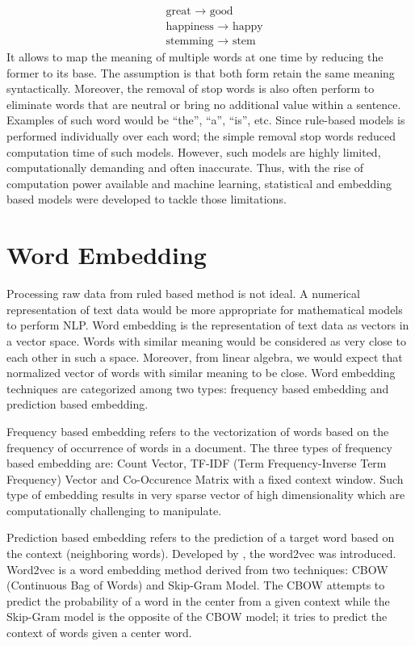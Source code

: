 \begin{align*}
    &\text{great → good} \\
    &\text{happiness → happy} \\
    &\text{stemming → stem}
\end{align*}
It allows to map the meaning of multiple words at one time by reducing the former to its base. The assumption is that both form retain the same meaning syntactically. Moreover, the removal of stop words is also often perform to eliminate words that are neutral or bring no additional value within a sentence. Examples of such word would be “the”, “a”, “is”, etc. Since rule-based models is performed individually over each word; the simple removal stop words reduced computation time of such models. However, such models are highly limited, computationally demanding and often inaccurate. Thus, with the rise of computation power available and machine learning, statistical and embedding based models were developed to tackle those limitations.
\section{Word Embedding}
Processing raw data from ruled based method is not ideal. A numerical representation of text data would be more appropriate for mathematical models to perform NLP. Word embedding is the representation of text data as vectors in a vector space. Words with similar meaning would be considered as very close to each other in such a space. Moreover, from linear algebra, we would expect that normalized vector of words with similar meaning to be close. Word embedding techniques are categorized among two types: frequency based embedding and prediction based embedding. 

Frequency based embedding refers to the vectorization of words based on the frequency of occurrence of words in a document. The three types of frequency based embedding are: Count Vector, TF-IDF (Term Frequency-Inverse Term Frequency) Vector and Co-Occurence Matrix with a fixed context window. Such type of embedding results in very sparse vector of high dimensionality which are computationally challenging to manipulate. 

Prediction based embedding refers to the prediction of a target word based on the context (neighboring words). Developed by \cite{Mikolov2013}, the word2vec was introduced. Word2vec is a word embedding method derived from two techniques: CBOW (Continuous Bag of Words) and Skip-Gram Model. The CBOW attempts to predict the probability of a word in the center from a given context while the Skip-Gram model is the opposite of the CBOW model; it tries to predict the context of words given a center word.
